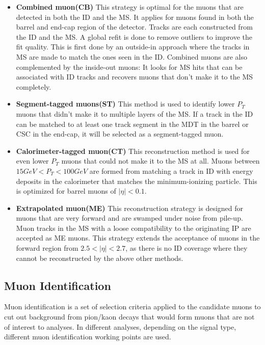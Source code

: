 \begin{itemize}
\item \textbf{Combined muon(CB)}
    This strategy is optimal for the muons that are detected in both the ID and the MS. It applies for muons found in both the barrel and end-cap region of the detector. Tracks are each constructed from the ID and the MS. A global refit is done to remove outliers to improve the fit quality. This is first done by an outside-in approach where the tracks in MS are made to match the ones seen in the ID. Combined muons are also complemented by the inside-out muons: It looks for MS hits that can be associated with ID tracks and recovers muons that don't make it to the MS completely.

\item \textbf{Segment-tagged muons(ST)}
This method is used to identify lower $P_{T}$ muons that didn't make it to multiple layers of the MS. If a track in the ID can be matched to at least one track segment in the MDT in the barrel or CSC in the end-cap, it will be selected as a segment-tagged muon. 

\item \textbf{Calorimeter-tagged muon(CT)}
This reconstruction method is used for even lower $P_{T}$ muons that could not make it to the MS at all. Muons between $15 GeV < P_{T} < 100GeV$ are formed from matching a track in ID with energy deposits in the calorimeter that matches the minimum-ionizing particle. This is optimized for barrel muons of $|\eta| <0.1$. 

\item \textbf{Extrapolated muon(ME)}
    This reconstruction strategy is designed for muons that are very forward and are swamped under noise from pile-up. Muon tracks in the MS with a loose compatibility to the originating IP are accepted as ME muons. This strategy extends the acceptance of muons in the forward region from $2.5<|\eta|<2.7$, as there is no ID coverage where they cannot be reconstructed by the above other methods.
\end{itemize}

\subsection{Muon Identification}
Muon identification is a set of selection criteria applied to the candidate muons to cut out background from pion/kaon decays that would form muons that are not of interest to analyses. In different analyses, depending on the signal type, different muon identification working points are used.

